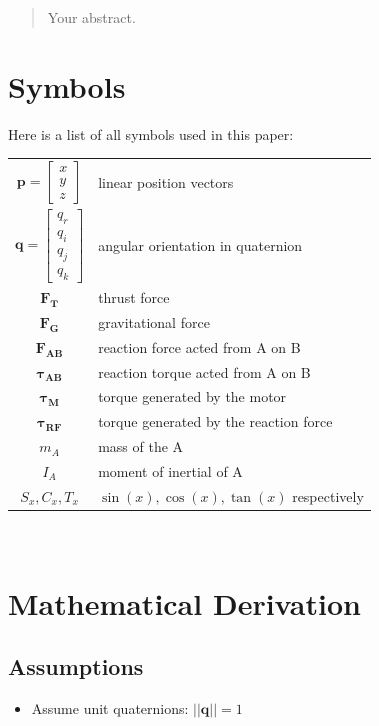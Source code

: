 \begin{abstract}
Your abstract.
\end{abstract}
\section{Symbols}
Here is a list of all symbols used in this paper:
\\
\begin{tabular}{c p{}}
  $\bm{p} = \begin{bmatrix}x \\ y \\ z \end{bmatrix}$ & linear position vectors \\
  $\bm{q} = \begin{bmatrix} q_r \\ q_i \\ q_j \\ q_k \end{bmatrix}$ & angular orientation in quaternion \\
  $\bm{F_{T}}$ & thrust force \\
  $\bm{F_{G}}$ & gravitational force \\  
  $\bm{F_{AB}}$ & reaction force acted from A on B \\
  $\bm{\tau_{AB}}$ & reaction torque acted from A on B \\
  $\bm{\tau_{M}}$ & torque generated by the motor \\
  $\bm{\tau_{RF}}$ & torque generated by the reaction force \\  
  $m_A$ & mass of the A \\
  $I_A$ & moment of inertial of A \\
  $S_x, C_x, T_x$ & $\sin(x), \cos(x), \tan(x)$ respectively \\
\end{tabular}\\
\section{Mathematical Derivation}

\subsection{Assumptions}
\begin{itemize}
\item Assume unit quaternions: $||\bm{q}|| = 1$
\end{itemize}
\newpage
